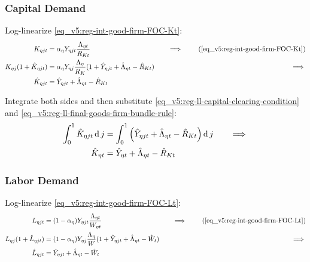\documentclass[../thesis.tex]{subfiles}
\begin{document}

\subsubsection*{Capital Demand}

Log-linearize \ref{eq_v5:reg-int-good-firm-FOC-Kt}:
\begin{alignat}{2}
	K_{\eta jt} &= {\alpha_{\eta}} Y_{\eta jt} \frac{\Lambda_{\eta t}}{R_{Kt}} &\implies \tag{\ref{eq_v5:reg-int-good-firm-FOC-Kt}} \\
	K_{\eta j} (1+ \hat{K}_{\eta jt}) &= {\alpha_{\eta}} Y_{\eta j} \frac{\Lambda_{\eta}}{R_{K}} (1+ \hat{Y}_{\eta jt} + \hat{\Lambda}_{\eta t} - \hat{R}_{K t}) \quad &\implies \nonumber \\
	\hat{K}_{\eta jt} &= \hat{Y}_{\eta jt} + \hat{\Lambda}_{\eta t} - \hat{R}_{K t} \nonumber
\end{alignat}

Integrate both sides and then substitute \ref{eq_v5:reg-ll-capital-clearing-condition} and \ref{eq_v5:reg-ll-final-goods-firm-bundle-rule}:
\begin{alignat}{2}
	\int_{0}^{1} \hat{K}_{\eta jt} \operatorname{d} j &= \int_{0}^{1} \left( \hat{Y}_{\eta jt} + \hat{\Lambda}_{\eta t} - \hat{R}_{K t} \right) \operatorname{d} j \quad &\implies \nonumber \\
	\hat{K}_{\eta t} &= \hat{Y}_{\eta t} + \hat{\Lambda}_{\eta t} - \hat{R}_{K t} \label{eq_v5:reg-ll-int-good-firm-FOC-Kt}
\end{alignat}


\subsubsection*{Labor Demand}

Log-linearize \ref{eq_v5:reg-int-good-firm-FOC-Lt}:
\begin{alignat}{2}
	L_{\eta jt} &= (1-\alpha_{\eta}) Y_{\eta jt} \frac{\Lambda_{\eta t}}{W_{\eta t}} &\implies \tag{\ref{eq_v5:reg-int-good-firm-FOC-Lt}} \\
	L_{\eta j} (1+ \hat{L}_{\eta jt}) &= (1-\alpha_{\eta}) Y_{\eta j} \frac{\Lambda_{\eta}}{W} (1+ \hat{Y}_{\eta jt} +\hat{\Lambda}_{\eta t} -\hat{W}_{t}) \quad &\implies \nonumber \\
	\hat{L}_{\eta jt} &= \hat{Y}_{\eta jt} +\hat{\Lambda}_{\eta t} -\hat{W}_{t} \nonumber
\end{alignat}
\end{document}
